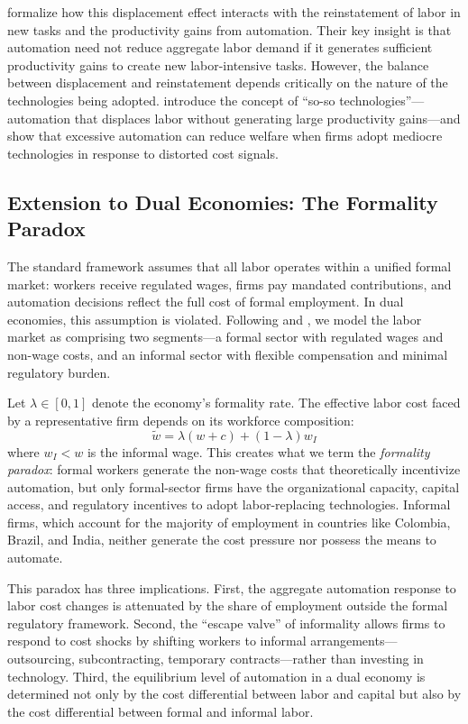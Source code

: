 \documentclass[5p,times,authoryear]{elsarticle}
\begin{document}
\citet{acemoglu2022tasks} formalize how this displacement effect interacts with the reinstatement of labor in new tasks and the productivity gains from automation. Their key insight is that automation need not reduce aggregate labor demand if it generates sufficient productivity gains to create new labor-intensive tasks. However, the balance between displacement and reinstatement depends critically on the nature of the technologies being adopted. \citet{acemoglu2020taxes} introduce the concept of ``so-so technologies''---automation that displaces labor without generating large productivity gains---and show that excessive automation can reduce welfare when firms adopt mediocre technologies in response to distorted cost signals.

\subsection{Extension to Dual Economies: The Formality Paradox}
\label{subsec:dual_economy}

The standard framework assumes that all labor operates within a unified formal market: workers receive regulated wages, firms pay mandated contributions, and automation decisions reflect the full cost of formal employment. In dual economies, this assumption is violated. Following \citet{laporta2014} and \citet{ulyssea2018}, we model the labor market as comprising two segments---a formal sector with regulated wages and non-wage costs, and an informal sector with flexible compensation and minimal regulatory burden.

Let $\lambda \in [0,1]$ denote the economy's formality rate. The effective labor cost faced by a representative firm depends on its workforce composition:
\begin{equation}
\label{eq:effective_cost}
\tilde{w} = \lambda(w + c) + (1-\lambda) w_I
\end{equation}
where $w_I < w$ is the informal wage. This creates what we term the \emph{formality paradox}: formal workers generate the non-wage costs that theoretically incentivize automation, but only formal-sector firms have the organizational capacity, capital access, and regulatory incentives to adopt labor-replacing technologies. Informal firms, which account for the majority of employment in countries like Colombia, Brazil, and India, neither generate the cost pressure nor possess the means to automate.

This paradox has three implications. First, the aggregate automation response to labor cost changes is attenuated by the share of employment outside the formal regulatory framework. Second, the ``escape valve'' of informality allows firms to respond to cost shocks by shifting workers to informal arrangements---outsourcing, subcontracting, temporary contracts---rather than investing in technology. Third, the equilibrium level of automation in a dual economy is determined not only by the cost differential between labor and capital but also by the cost differential between formal and informal labor.
\end{document}
